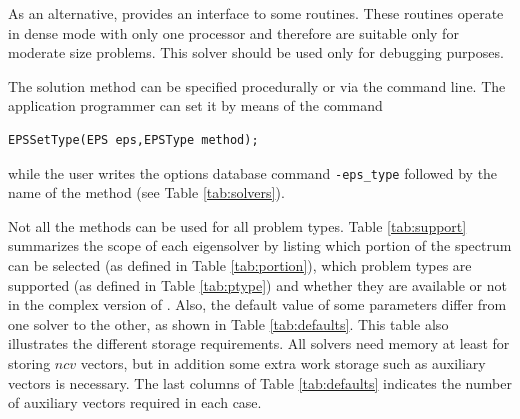 As an alternative, \slepc provides an interface to some \lapack routines. These routines operate in dense mode with only one processor and therefore are suitable only for moderate size problems. This solver should be used only for debugging purposes.

The solution method can be specified procedurally or via the command line. The application programmer can set it by means of the command
	\begin{Verbatim}[fontsize=\small]
	EPSSetType(EPS eps,EPSType method);
	\end{Verbatim}
while the user writes the options database command \Verb!-eps_type! followed by the name of the method (see Table \ref{tab:solvers}).

	Not all the methods can be used for all problem types. Table \ref{tab:support} summarizes the scope of each eigensolver by listing which portion of the spectrum can be selected (as defined in Table \ref{tab:portion}), which problem types are supported (as defined in Table \ref{tab:ptype}) and whether they are available or not in the complex version of \slepc. Also, the default value of some parameters differ from one solver to the other, as shown in Table \ref{tab:defaults}. This table also illustrates the different storage requirements. All solvers need memory at least for storing $ncv$ vectors, but in addition some extra work storage such as auxiliary vectors is necessary. The last columns of Table \ref{tab:defaults} indicates the number of auxiliary vectors required in each case.

